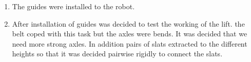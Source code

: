 \begin{enumerate}
\begin{enumerate}
      \item The guides were installed to the robot.
      
      \item After installation of guides was decided to test the working of the lift. the belt coped with this task but the axles were bends. It was decided that we need more strong axles. In addition  pairs of slats extracted to the different heights so that it was decided pairwise rigidly to connect the slats.
      
      \begin{figure}[H]
      	\begin{minipage}[h]{0.47\linewidth}
      	\end{minipage}
      	\hfill
      	\begin{minipage}[h]{0.47\linewidth}

\end{minipage}
\end{figure}
\end{enumerate}
\end{enumerate}
